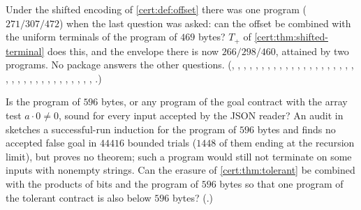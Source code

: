 \begin{question}
Under the shifted encoding of \cref{cert:def:offset} there was one program
($271/307/472$) when the last question was asked: can the offset be combined with the
uniform terminals of the program of $469$ bytes? $T_{+}$ of
\cref{cert:thm:shifted-terminal} does this, and the envelope there is now
$266/298/460$, attained by two programs. No package answers the other questions. (,
, , ,
, , ,
, , ,
, ,
, , ,
, , ,
, ,
, , ,
, , ,
, , ,
, , ,
, ,
, , .)
\end{question}

\begin{question}
Is the program of $596$ bytes, or any program of the goal contract with the
array test $a\cdot 0\neq 0$, sound for every input accepted by the JSON reader?
An audit in  sketches a successful-run induction for
the program of $596$ bytes and finds no accepted false goal in $44416$ bounded
trials ($1448$ of them ending at the recursion limit), but proves no theorem;
such a program would still not terminate on some inputs with nonempty strings.
Can the erasure of \cref{cert:thm:tolerant} be combined with the products of bits
and the program of $596$ bytes so that one program of the tolerant contract is
also below $596$ bytes? (.)
\end{question}


